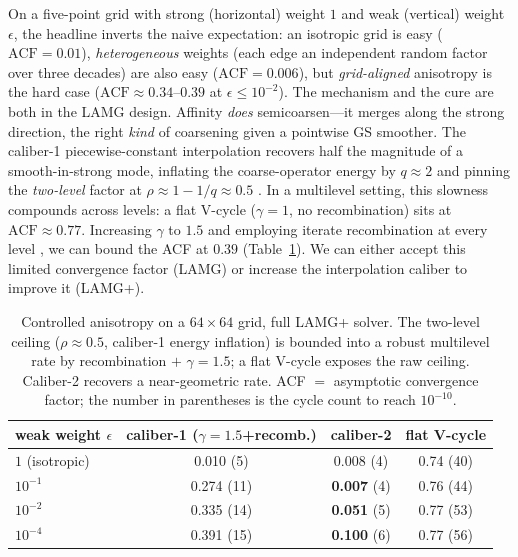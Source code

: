 \documentclass[review]{siamart220329}
\newcommand{\acf}{\mathrm{ACF}}
\begin{document}
On a five-point grid with strong (horizontal) weight $1$ and weak (vertical) weight $\epsilon$,
the headline inverts the naive expectation: an isotropic grid is easy ($\acf=0.01$),
\emph{heterogeneous} weights (each edge an independent random factor over three decades) are
also easy ($\acf=0.006$), but \emph{grid-aligned} anisotropy is the hard case
($\acf\approx0.34$--$0.39$ at $\epsilon\le10^{-2}$). The mechanism and the cure are both in the
LAMG design. Affinity \emph{does} semicoarsen---it merges along the strong direction, the right
\emph{kind} of coarsening given a pointwise GS smoother. The caliber-1 piecewise-constant interpolation recovers half the magnitude of a
smooth-in-strong mode, inflating the coarse-operator energy by $q\approx2$ and pinning the
\emph{two-level} factor at $\rho\approx1-1/q\approx0.5$ \cite[\S3.4.3]{lamg}. In a multilevel setting, this slowness compounds across levels: a flat V-cycle ($\gamma=1$, no recombination) sits at $\acf\approx0.77$. Increasing $\gamma$ to $1.5$ and employing iterate recombination at every level \cite[\S3.4.5]{lamg}, we can bound the ACF at $0.39$ (Table~\ref{tab:aniso}). We can either accept this limited convergence factor (LAMG) or increase the interpolation caliber to improve it (LAMG+).

\begin{table}[h]\centering
\caption{Controlled anisotropy on a $64\times64$ grid, full LAMG+ solver. The two-level ceiling
($\rho\approx0.5$, caliber-1 energy inflation) is bounded into a robust multilevel rate by
recombination $+$ $\gamma=1.5$; a flat V-cycle exposes the raw ceiling. Caliber-2 recovers a
near-geometric rate. ACF $=$ asymptotic convergence factor; the number in parentheses is the
cycle count to reach $10^{-10}$.}\label{tab:aniso}
\begin{tabular}{lccc}
\toprule
weak weight $\epsilon$ & caliber-1 ($\gamma{=}1.5$+recomb.) & \textbf{caliber-2} & flat V-cycle\\
\midrule
$1$ (isotropic)   & 0.010 (5)  & 0.008 (4)          & 0.74 (40)\\
$10^{-1}$         & 0.274 (11) & \textbf{0.007} (4) & 0.76 (44)\\
$10^{-2}$         & 0.335 (14) & \textbf{0.051} (5) & 0.77 (53)\\
$10^{-4}$         & 0.391 (15) & \textbf{0.100} (6) & 0.77 (56)\\
\bottomrule
\end{tabular}
\end{table}
\end{document}
